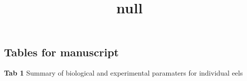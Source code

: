 \documentclass[
]{article}
\title{null}
\author{}
\date{\vspace{-2.5em}}
\newenvironment{Shaded}{\begin{snugshade}}{\end{snugshade}}
\newcommand{\AttributeTok}[1]{\textcolor[rgb]{0.77,0.63,0.00}{#1}}
\newcommand{\ConstantTok}[1]{\textcolor[rgb]{0.00,0.00,0.00}{#1}}
\newcommand{\FunctionTok}[1]{\textcolor[rgb]{0.00,0.00,0.00}{#1}}
\newcommand{\NormalTok}[1]{#1}
\newcommand{\SpecialCharTok}[1]{\textcolor[rgb]{0.00,0.00,0.00}{#1}}
\newcommand{\StringTok}[1]{\textcolor[rgb]{0.31,0.60,0.02}{#1}}
\begin{document}
\maketitle

\begin{Shaded}
\end{Shaded}

\hypertarget{tables-for-manuscript}{%
\subsection{Tables for manuscript}\label{tables-for-manuscript}}

\textbf{Tab 1} Summary of biological and experimental paramaters for
individual eels

\providecommand{\docline}[3]{\noalign{\global\setlength{\arrayrulewidth}{#1}}\arrayrulecolor[HTML]{#2}\cline{#3}}

\setlength{\tabcolsep}{0pt}

\renewcommand*{\arraystretch}{1.5}
\end{document}
